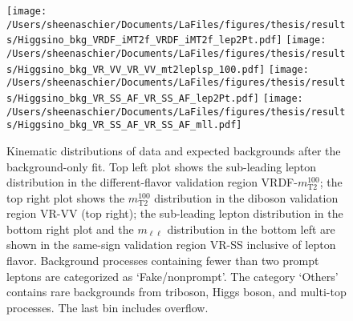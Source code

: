  \begin{figure}%
  \begin{center}
  \texttt{[image: /Users/sheenaschier/Documents/LaFiles/figures/thesis/results/Higgsino\_bkg\_VRDF\_iMT2f\_VRDF\_iMT2f\_lep2Pt.pdf]}
  \texttt{[image: /Users/sheenaschier/Documents/LaFiles/figures/thesis/results/Higgsino\_bkg\_VR\_VV\_VR\_VV\_mt2leplsp\_100.pdf]}
   \texttt{[image: /Users/sheenaschier/Documents/LaFiles/figures/thesis/results/Higgsino\_bkg\_VR\_SS\_AF\_VR\_SS\_AF\_lep2Pt.pdf]}
   \texttt{[image: /Users/sheenaschier/Documents/LaFiles/figures/thesis/results/Higgsino\_bkg\_VR\_SS\_AF\_VR\_SS\_AF\_mll.pdf]}
   \end{center}
 \caption{Kinematic distributions of data and expected backgrounds after the background-only fit.  Top left plot shows the sub-leading lepton \pt distribution in the different-flavor validation region VRDF-$m_\text{T2}^{100}$; the top right plot shows the $m_\text{T2}^{100}$ distribution in the diboson validation region VR-VV (top right); the sub-leading lepton \pt  distribution in the bottom right plot and the $m_{\ell\ell}$ distribution in the bottom left are shown in the same-sign validation region VR-SS inclusive of lepton flavor.  Background processes containing fewer than two prompt leptons are categorized as `Fake/nonprompt'.  The category `Others' contains rare backgrounds from triboson, Higgs boson, and multi-top processes.  The last bin includes overflow.}
 \label{fig:postfitplots}
 \end{figure}
 
